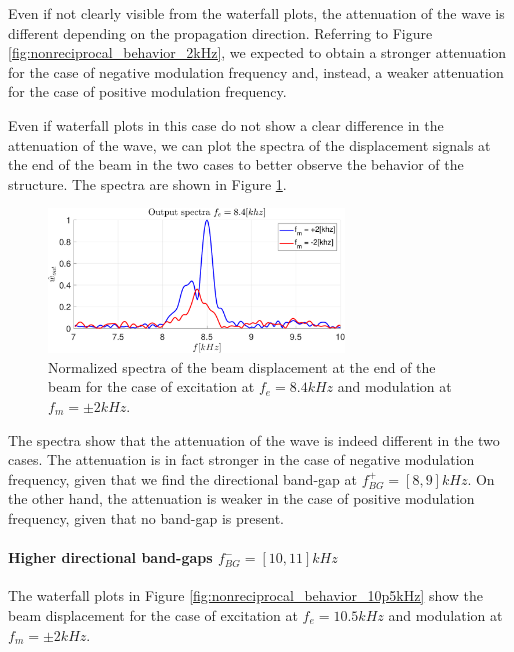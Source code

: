 Even if not clearly visible from the waterfall plots, the attenuation of the wave is different depending on the propagation direction.
Referring to Figure \ref{fig:nonreciprocal_behavior_2kHz}, we expected to obtain a stronger attenuation for the case of negative modulation frequency and, instead, a weaker attenuation for the case of positive modulation frequency.

Even if waterfall plots in this case do not show a clear difference in the attenuation of the wave, we can plot the spectra of the displacement signals at the end of the beam in the two cases to better observe the behavior of the structure.
The spectra are shown in Figure \ref{fig:nonreciprocal_behavior_8p4kHz_spectra}.

\begin{figure}[H]
    \centering
    \includegraphics[width=0.7\textwidth]{img/MATLAB/Spectra_narrow8p4kHz_2000.pdf}
    \caption{Normalized spectra of the beam displacement at the end of the beam for the case of excitation at $f_e = 8.4 kHz$ and modulation at $f_m = \pm 2 kHz$.}
    \label{fig:nonreciprocal_behavior_8p4kHz_spectra}
\end{figure}

The spectra show that the attenuation of the wave is indeed different in the two cases.
The attenuation is in fact stronger in the case of negative modulation frequency, given that we find the directional band-gap at $f_{BG}^+ = [8, 9] kHz$.
On the other hand, the attenuation is weaker in the case of positive modulation frequency, given that no band-gap is present.


\paragraph{Higher directional band-gaps $f_{BG}^- = [10, 11] kHz$}

The waterfall plots in Figure \ref{fig:nonreciprocal_behavior_10p5kHz} show the beam displacement for the case of excitation at $f_e = 10.5 kHz$ and modulation at $f_m = \pm 2 kHz$.

